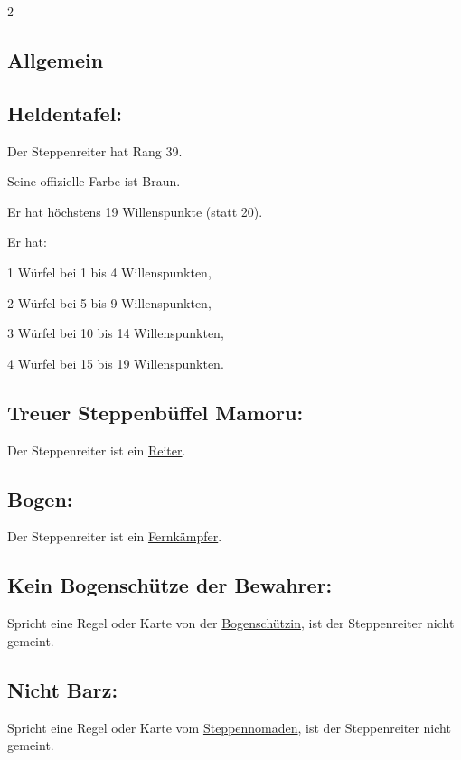 \documentclass[10pt, a4paper, oneside]{book}
\begin{document}
\begin{multicols*}{2}\raggedcolumns

\begin{nobgcolor}

\section{Allgemein}

\subsection{Heldentafel:}

Der Steppenreiter hat Rang 39.

Seine offizielle Farbe ist Braun.

Er hat höchstens 19 Willenspunkte (statt 20).

Er hat:

\bullet{} 1 Würfel bei 1 bis 4 Willenspunkten,

\bullet{} 2 Würfel bei 5 bis 9 Willenspunkten,

\bullet{} 3 Würfel bei 10 bis 14 Willenspunkten,

\bullet{} 4 Würfel bei 15 bis 19 Willenspunkten.






\subsection{Treuer Steppenbüffel Mamoru:}

Der Steppenreiter ist ein \hyperref[Reiter]{Reiter}.







\subsection{Bogen:}

Der Steppenreiter ist ein \hyperref[Fernkämpfer]{Fernkämpfer}.




\subsection{Kein Bogenschütze der Bewahrer:}

Spricht eine Regel oder Karte von der \hyperref[Bogenschützin]{Bogenschützin}, ist der Steppenreiter nicht gemeint.


\subsection{Nicht Barz:}

Spricht eine Regel oder Karte vom \hyperref[Steppennomade]{Steppennomaden}, ist der Steppenreiter nicht gemeint.



\end{nobgcolor}



\end{multicols*}
\end{document}
